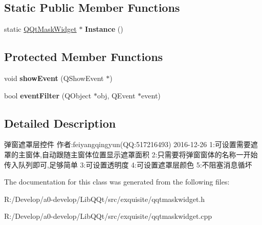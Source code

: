 \subsection*{Static Public Member Functions}
\begin{DoxyCompactItemize}
\item 
\mbox{\label{class_q_qt_mask_widget_a7340bc4ca66b37f25f8a9690f944a6ec}} 
static \mbox{\hyperlink{class_q_qt_mask_widget}{Q\+Qt\+Mask\+Widget}} $\ast$ {\bfseries Instance} ()
\end{DoxyCompactItemize}
\subsection*{Protected Member Functions}
\begin{DoxyCompactItemize}
\item 
\mbox{\label{class_q_qt_mask_widget_a1dbbac5cc9ad7fe258dad1f9abb20621}} 
void {\bfseries show\+Event} (Q\+Show\+Event $\ast$)
\item 
\mbox{\label{class_q_qt_mask_widget_a6aa037a6b1c6f05d277afe730748a80e}} 
bool {\bfseries event\+Filter} (Q\+Object $\ast$obj, Q\+Event $\ast$event)
\end{DoxyCompactItemize}


\subsection{Detailed Description}
弹窗遮罩层控件 作者\+:feiyangqingyun(\+Q\+Q\+:517216493) 2016-\/12-\/26 1\+:可设置需要遮罩的主窗体,自动跟随主窗体位置显示遮罩面积 2\+:只需要将弹窗窗体的名称一开始传入队列即可,足够简单 3\+:可设置透明度 4\+:可设置遮罩层颜色 5\+:不阻塞消息循坏 

The documentation for this class was generated from the following files\+:\begin{DoxyCompactItemize}
\item 
R\+:/\+Develop/a0-\/develop/\+Lib\+Q\+Qt/src/exquisite/qqtmaskwidget.\+h\item 
R\+:/\+Develop/a0-\/develop/\+Lib\+Q\+Qt/src/exquisite/qqtmaskwidget.\+cpp\end{DoxyCompactItemize}

